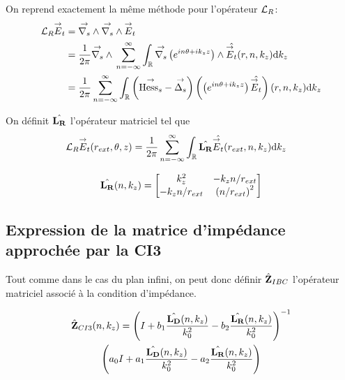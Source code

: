     On reprend exactement la même méthode pour l'opérateur \({\mathcal{L}_R}\):
    \begin{align}
      {\mathcal{L}_R} {\overset{\rightarrow}{E}}_t & = {\overset{\rightarrow}{\nabla_s}} \wedge{} {\overset{\rightarrow}{\nabla_s}} \wedge{} {\overset{\rightarrow}{E}}_t
      \\
      &=\dfrac{1}{2\pi}{\overset{\rightarrow}{\nabla_s}} \wedge{}\sum_{n=-\infty}^\infty\int_\mathbb R {\overset{\rightarrow}{\nabla_s}}{}\left(e^{in\theta + ik_zz}\right) \wedge \hat{{\overset{\rightarrow}{E}}_t}(r,n,k_z)\mathrm{d}{k_z}
      \\
      &= \dfrac{1}{2\pi}\sum_{n=-\infty}^\infty \int_\mathbb R \left({\overset{\rightarrow}{\operatorname{Hess}_s}} - {\overset{\rightarrow}{\Delta_s}}\right) \left(\left(e^{in\theta + ik_zz}\right) \hat{{\overset{\rightarrow}{E}}_t}\right)(r,n,k_z)\mathrm{d}{k_z}
    \end{align}

    On définit \(\hat{\mathbf{L_R}}\) l'opérateur matriciel tel que
    \begin{align}
      {\mathcal{L}_R} {\overset{\rightarrow}{E}}_t(r_{ext},\theta,z)
      &= \dfrac{1}{2\pi}\sum_{n=-\infty}^\infty\int_\mathbb R \hat{\mathbf{L_R}} \hat{{\overset{\rightarrow}{E}}_t}(r_{ext},n,k_z)\mathrm{d}{k_z}
    \end{align}

    \begin{equation}
      \hat{\mathbf{L_R}}(n,k_z) =
      \begin{bmatrix}
        k_z^2 & -k_z{n}\slash{r_{ext}}
        \\
        -k_z{n}\slash{r_{ext}} & \left({n}\slash{r_{ext}} \right)^2
      \end{bmatrix}
    \end{equation}

  \subsection{Expression de la matrice d'impédance approchée par la CI3}

    Tout comme dans le cas du plan infini, on peut donc définir \(\hat{\mathbf{Z}}_{IBC}\) l’opérateur matriciel associé à la condition d'impédance.

    \begin{multline}
        \hat{\mathbf{Z}}_{CI3}(n,k_z) = \left(I + b_1 \dfrac{\hat{\mathbf{L_D}}(n,k_z)}{k_0^2} - b_2 \dfrac{\hat{\mathbf{L_R}}(n,k_z)}{k_0^2} \right)^{-1}\\
        \left(a_0 I + a_1 \dfrac{\hat{\mathbf{L_D}}(n,k_z)}{k_0^2} - a_2 \dfrac{\hat{\mathbf{L_R}}(n,k_z)}{k_0^2}\right)
    \end{multline}
